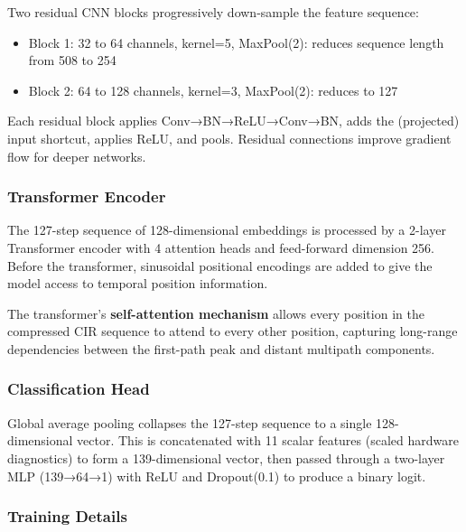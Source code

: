 \documentclass[12pt,a4paper]{article}
\providecommand{\tightlist}{%
  \setlength{\itemsep}{0pt}\setlength{\parskip}{0pt}}
\begin{document}
Two residual CNN blocks progressively down-sample the feature sequence:

\begin{itemize}
\tightlist
\item
  Block 1: 32 to 64 channels, kernel=5, MaxPool(2): reduces sequence
  length from 508 to 254
\item
  Block 2: 64 to 128 channels, kernel=3, MaxPool(2): reduces to 127
\end{itemize}

Each residual block applies Conv→BN→ReLU→Conv→BN, adds the (projected)
input shortcut, applies ReLU, and pools. Residual connections improve
gradient flow for deeper networks.

\subsubsection{Transformer Encoder}\label{transformer-encoder}

The 127-step sequence of 128-dimensional embeddings is processed by a
2-layer Transformer encoder with 4 attention heads and feed-forward
dimension 256. Before the transformer, sinusoidal positional encodings
are added to give the model access to temporal position information.

The transformer's \textbf{self-attention mechanism} allows every
position in the compressed CIR sequence to attend to every other
position, capturing long-range dependencies between the first-path peak
and distant multipath components.

\subsubsection{Classification Head}\label{classification-head}

Global average pooling collapses the 127-step sequence to a single
128-dimensional vector. This is concatenated with 11 scalar features
(scaled hardware diagnostics) to form a 139-dimensional vector, then
passed through a two-layer MLP (139→64→1) with ReLU and Dropout(0.1) to
produce a binary logit.

\subsubsection{Training Details}\label{training-details}
\end{document}
